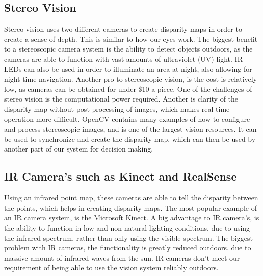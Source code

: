 \documentclass[compsoc,draftclsnofoot,onecolumn,10pt]{IEEEtran}
\begin{document}
\subsection{Stereo Vision}
Stereo-vision uses two different cameras to create disparity maps in order to create a sense of depth. 
This is similar to how our eyes work. 
The biggest benefit to a stereoscopic camera system is the ability to detect objects outdoors, as the cameras are able to function with vast amounts of ultraviolet (UV) light. 
IR LEDs can also be used in order to illuminate an area at night, also allowing for night-time navigation. 
Another pro to stereoscopic vision, is the cost is relatively low, as cameras can be obtained for under \$10 a piece.  
One of the challenges of stereo vision is the computational power required. 
Another is clarity of the disparity map without post processing of images, which makes real-time operation more difficult. 
\cite{acs}
OpenCV \cite{opencv} contains many examples of how to configure and process stereoscopic images, and is one of the largest vision resources. It can be used to synchronize and create the disparity map, which can then be used by another part of our system for decision making. 

\subsection{IR Camera's such as Kinect and RealSense}
Using an infrared point map, these cameras are able to tell the disparity between the points, which helps in creating disparity maps. The most popular example of an IR camera system, is the Microsoft Kinect. 
A big advantage to IR camera's, is the ability to function in low and non-natural lighting conditions, due to using the infrared spectrum, rather than only using the visible spectrum. 
The biggest problem with IR cameras, the functionality is greatly reduced outdoors, due to massive amount of infrared waves from the sun. 
IR cameras don't meet our requirement of being able to use the vision system reliably outdoors.
\end{document}
